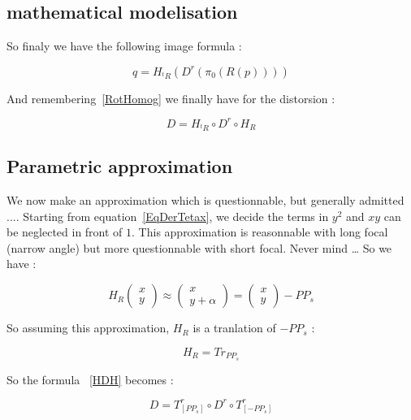 \subsection{mathematical modelisation}

So finaly we have the following image formula :

\begin{equation}
	q = H_{^tR} (D^r( \pi_0(R(p))))
\end{equation}

And remembering~\ref{RotHomog} we finally have for the distorsion :

\begin{equation}
	D = H_{^tR} \circ  D^r \circ   H_{R} \label{HDH}
\end{equation}


\subsection{Parametric approximation}

We now make an approximation which is questionnable, but generally admitted ....
Starting from equation~\ref{EqDerTetax}, we decide the terms in $y^2$
and $xy$ can be neglected in front of $1$.  This approximation is reasonnable
with long focal (narrow angle) but more questionnable with short focal.  Never mind \dots
So we have :


\begin{equation}
	H_{R}\begin{pmatrix} x \\ y \end{pmatrix}  \approx \begin{pmatrix} x \\ y  +\alpha \end{pmatrix}
		= \begin{pmatrix} x \\ y  \end{pmatrix} - PP_s
\end{equation}

So assuming this approximation,  $H_{R}$ is a tranlation of $ - PP_s$ :

\begin{equation}
	H_{R} = Tr_{PP_s}
\end{equation}

So the formula ~\ref{HDH} becomes :

\begin{equation}
	D =    T^r_{[PP_s]}  \circ  D^r \circ  T^r_{[-PP_s]} \label{TDT}
\end{equation}

